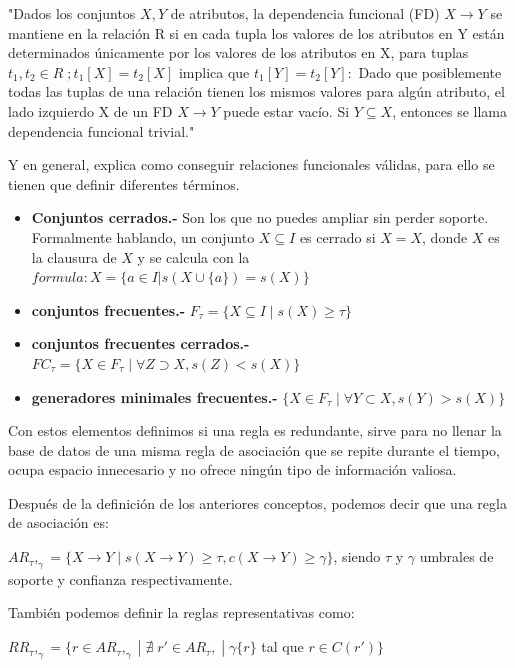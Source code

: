 \documentclass{cosas/tfg_domingo}
\begin{document}
"Dados los conjuntos $ X, Y $ de atributos, la dependencia funcional (FD) $ X \rightarrow Y $ se mantiene en la relación R si en cada tupla los valores de los atributos en Y están determinados únicamente por los valores de los atributos en X, para tuplas $ t_1 , t_2 \in R \;; t_1 [X] = t_2 [X] $ implica que $ t_1 [Y] = t_2 [Y]: $ Dado que posiblemente todas las tuplas de una relación tienen los mismos valores para algún atributo, el lado izquierdo X de un FD $ X \rightarrow Y $ puede estar vacío. Si $Y \subseteq X$, entonces se llama dependencia funcional trivial."

Y en general, explica como conseguir relaciones funcionales válidas, para ello se tienen que definir diferentes términos.

\begin{itemize}
    \item \textbf{Conjuntos cerrados.-} Son los que no puedes ampliar sin perder soporte. Formalmente hablando, un conjunto $X \subseteq I$ es cerrado si $X=X$, donde $X$ es la clausura de $X$ y se calcula con la $formula :X=\{a \in I |s( X \cup\{a\}) = s(X)\}$
    
    \item \textbf{conjuntos frecuentes.-} $F_\tau=\{X \subseteq I \;|\; s(X) \geq \tau\}$
    \item \textbf{conjuntos frecuentes cerrados.-} $FC_\tau=\{X \in F_\tau \;|\; \forall Z \supset X,s(Z)<s(X)\}$
    \item \textbf{generadores minimales frecuentes.-} $\{X \in F_\tau \;|\; \forall Y \subset X,s(Y)>s(X)\}$
    
\end{itemize}

Con estos elementos definimos si una regla es redundante, sirve para no llenar la base de datos de una misma regla de asociación que se repite durante el tiempo, ocupa espacio innecesario y no ofrece ningún tipo de información valiosa.

Después de la definición de los anteriores conceptos, podemos decir  que una regla de asociación es:

$AR_\tau,_\gamma=\{X\rightarrow Y \;|\; s(X \rightarrow Y)\geq \tau,c(X \rightarrow Y) \geq \gamma\}$, siendo $\tau$ y $\gamma$ umbrales de soporte y confianza respectivamente.

También podemos definir la reglas representativas como:

$RR_\tau,_\gamma=\{r \in AR_\tau,_\gamma \;|\; \nexists \; r′ \in AR_\tau, \;|\; \gamma\{r\}$ tal que $r \in C(r′)\}$ \citep{UC}
\end{document}
